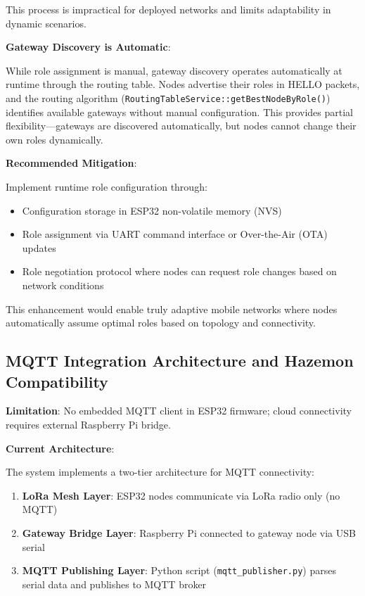 This process is impractical for deployed networks and limits adaptability in dynamic scenarios.

\textbf{Gateway Discovery is Automatic}:

While role assignment is manual, gateway discovery operates automatically at runtime through the routing table. Nodes advertise their roles in HELLO packets, and the routing algorithm (\texttt{RoutingTableService::getBestNodeByRole()}) identifies available gateways without manual configuration. This provides partial flexibility---gateways are discovered automatically, but nodes cannot change their own roles dynamically.

\textbf{Recommended Mitigation}:

Implement runtime role configuration through:
\begin{itemize}
\item Configuration storage in ESP32 non-volatile memory (NVS)
\item Role assignment via UART command interface or Over-the-Air (OTA) updates
\item Role negotiation protocol where nodes can request role changes based on network conditions
\end{itemize}

This enhancement would enable truly adaptive mobile networks where nodes automatically assume optimal roles based on topology and connectivity.

\subsection{MQTT Integration Architecture and Hazemon Compatibility}

\textbf{Limitation}: No embedded MQTT client in ESP32 firmware; cloud connectivity requires external Raspberry Pi bridge.

\textbf{Current Architecture}:

The system implements a two-tier architecture for MQTT connectivity:

\begin{enumerate}
\item \textbf{LoRa Mesh Layer}: ESP32 nodes communicate via LoRa radio only (no MQTT)
\item \textbf{Gateway Bridge Layer}: Raspberry Pi connected to gateway node via USB serial
\item \textbf{MQTT Publishing Layer}: Python script (\texttt{mqtt\_publisher.py}) parses serial data and publishes to MQTT broker
\end{enumerate}


